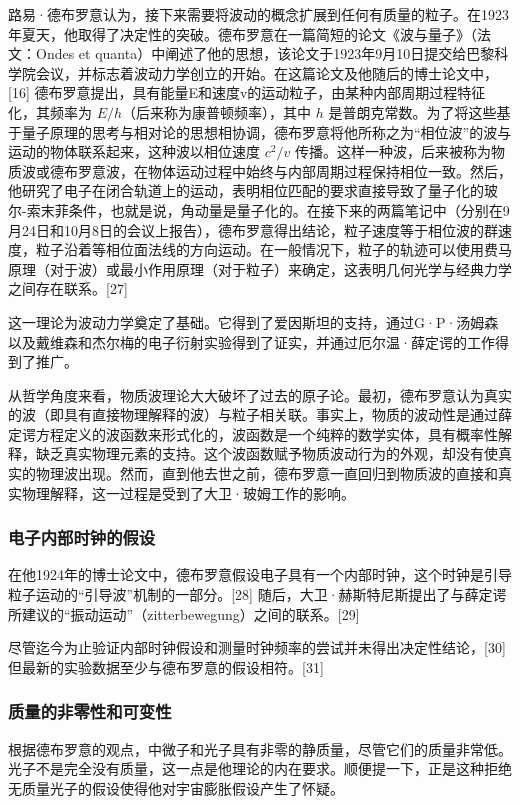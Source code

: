 路易·德布罗意认为，接下来需要将波动的概念扩展到任何有质量的粒子。在1923年夏天，他取得了决定性的突破。德布罗意在一篇简短的论文《波与量子》（法文：Ondes et quanta）中阐述了他的思想，该论文于1923年9月10日提交给巴黎科学院会议，并标志着波动力学创立的开始。在这篇论文及他随后的博士论文中，[16] 德布罗意提出，具有能量E和速度v的运动粒子，由某种内部周期过程特征化，其频率为 \(E/h\)（后来称为康普顿频率），其中 \(h\) 是普朗克常数。为了将这些基于量子原理的思考与相对论的思想相协调，德布罗意将他所称之为“相位波”的波与运动的物体联系起来，这种波以相位速度 \(c^{2}/v\) 传播。这样一种波，后来被称为物质波或德布罗意波，在物体运动过程中始终与内部周期过程保持相位一致。然后，他研究了电子在闭合轨道上的运动，表明相位匹配的要求直接导致了量子化的玻尔-索末菲条件，也就是说，角动量是量子化的。在接下来的两篇笔记中（分别在9月24日和10月8日的会议上报告），德布罗意得出结论，粒子速度等于相位波的群速度，粒子沿着等相位面法线的方向运动。在一般情况下，粒子的轨迹可以使用费马原理（对于波）或最小作用原理（对于粒子）来确定，这表明几何光学与经典力学之间存在联系。[27]

这一理论为波动力学奠定了基础。它得到了爱因斯坦的支持，通过G·P·汤姆森以及戴维森和杰尔梅的电子衍射实验得到了证实，并通过厄尔温·薛定谔的工作得到了推广。

从哲学角度来看，物质波理论大大破坏了过去的原子论。最初，德布罗意认为真实的波（即具有直接物理解释的波）与粒子相关联。事实上，物质的波动性是通过薛定谔方程定义的波函数来形式化的，波函数是一个纯粹的数学实体，具有概率性解释，缺乏真实物理元素的支持。这个波函数赋予物质波动行为的外观，却没有使真实的物理波出现。然而，直到他去世之前，德布罗意一直回归到物质波的直接和真实物理解释，这一过程是受到了大卫·玻姆工作的影响。
\subsubsection{电子内部时钟的假设}  
在他1924年的博士论文中，德布罗意假设电子具有一个内部时钟，这个时钟是引导粒子运动的“引导波”机制的一部分。[28] 随后，大卫·赫斯特尼斯提出了与薛定谔所建议的“振动运动”（zitterbewegung）之间的联系。[29]

尽管迄今为止验证内部时钟假设和测量时钟频率的尝试并未得出决定性结论，[30] 但最新的实验数据至少与德布罗意的假设相符。[31]
\subsubsection{质量的非零性和可变性}  
根据德布罗意的观点，中微子和光子具有非零的静质量，尽管它们的质量非常低。光子不是完全没有质量，这一点是他理论的内在要求。顺便提一下，正是这种拒绝无质量光子的假设使得他对宇宙膨胀假设产生了怀疑。


